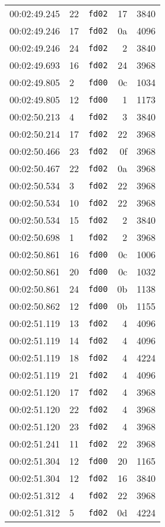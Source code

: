 \documentclass{article}
\begin{document}
\begin{longtable}{lllrr}
00:02:49.245 & 22 & \texttt{fd02} & 17 & 3840 \\
00:02:49.246 & 17 & \texttt{fd02} & 0a & 4096 \\
00:02:49.246 & 24 & \texttt{fd02} & 2 & 3840 \\
00:02:49.693 & 16 & \texttt{fd02} & 24 & 3968 \\
00:02:49.805 & 2 & \texttt{fd00} & 0c & 1034 \\
00:02:49.805 & 12 & \texttt{fd00} & 1 & 1173 \\
00:02:50.213 & 4 & \texttt{fd02} & 3 & 3840 \\
00:02:50.214 & 17 & \texttt{fd02} & 22 & 3968 \\
00:02:50.466 & 23 & \texttt{fd02} & 0f & 3968 \\
00:02:50.467 & 22 & \texttt{fd02} & 0a & 3968 \\
00:02:50.534 & 3 & \texttt{fd02} & 22 & 3968 \\
00:02:50.534 & 10 & \texttt{fd02} & 22 & 3968 \\
00:02:50.534 & 15 & \texttt{fd02} & 2 & 3840 \\
00:02:50.698 & 1 & \texttt{fd02} & 2 & 3968 \\
00:02:50.861 & 16 & \texttt{fd00} & 0c & 1006 \\
00:02:50.861 & 20 & \texttt{fd00} & 0c & 1032 \\
00:02:50.861 & 24 & \texttt{fd00} & 0b & 1138 \\
00:02:50.862 & 12 & \texttt{fd00} & 0b & 1155 \\
00:02:51.119 & 13 & \texttt{fd02} & 4 & 4096 \\
00:02:51.119 & 14 & \texttt{fd02} & 4 & 4096 \\
00:02:51.119 & 18 & \texttt{fd02} & 4 & 4224 \\
00:02:51.119 & 21 & \texttt{fd02} & 4 & 4096 \\
00:02:51.120 & 17 & \texttt{fd02} & 4 & 3968 \\
00:02:51.120 & 22 & \texttt{fd02} & 4 & 3968 \\
00:02:51.120 & 23 & \texttt{fd02} & 4 & 3968 \\
00:02:51.241 & 11 & \texttt{fd02} & 22 & 3968 \\
00:02:51.304 & 12 & \texttt{fd00} & 20 & 1165 \\
00:02:51.304 & 12 & \texttt{fd02} & 16 & 3840 \\
00:02:51.312 & 4 & \texttt{fd02} & 22 & 3968 \\
00:02:51.312 & 5 & \texttt{fd02} & 0d & 4224 \\

\end{longtable}
\end{document}
